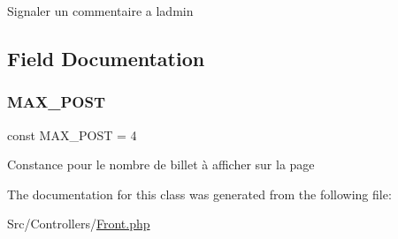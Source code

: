 Signaler un commentaire a l\textquotesingle{}admin 

\subsection{Field Documentation}
\mbox{\label{class_src_1_1_controllers_1_1_front_ae6f0a6c86ad9f61cbc99ad3c4180b481}} 
\subsubsection{\texorpdfstring{M\+A\+X\+\_\+\+P\+O\+ST}{MAX\_POST}}
{\footnotesize\ttfamily const M\+A\+X\+\_\+\+P\+O\+ST = 4}

Constance pour le nombre de billet à afficher sur la page 

The documentation for this class was generated from the following file\+:\begin{DoxyCompactItemize}
\item 
Src/\+Controllers/\hyperlink{_front_8php}{Front.\+php}\end{DoxyCompactItemize}

